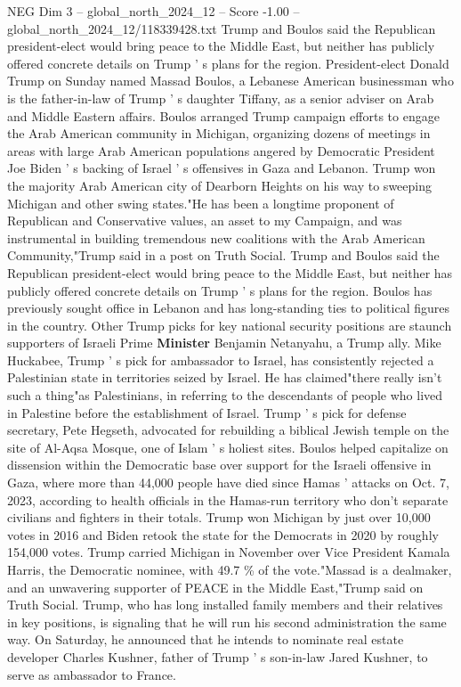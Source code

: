 \begin{textsample}{NEG Dim 3 – global\_north\_2024\_12 – Score -1.00 – global\_north\_2024\_12/118339428.txt}  \label{ex:f3_neg_222}
Trump and Boulos said the Republican president-elect would bring peace to the Middle East, but neither has publicly offered concrete details on Trump ' s plans for the region.
President-elect Donald Trump on Sunday named Massad Boulos, a Lebanese American businessman who is the father-in-law of Trump ' s daughter Tiffany, as a senior adviser on Arab and Middle Eastern affairs.
Boulos arranged Trump campaign efforts to engage the Arab American community in Michigan, organizing dozens of meetings in areas with large Arab American populations angered by Democratic President Joe Biden ' s backing of Israel ' s offensives in Gaza and Lebanon.
Trump won the majority Arab American city of Dearborn Heights on his way to sweeping Michigan and other swing states."He has been a longtime proponent of Republican and Conservative values, an asset to my Campaign, and was instrumental in building tremendous new coalitions with the Arab American Community,"Trump said in a post on Truth Social.
Trump and Boulos said the Republican president-elect would bring peace to the Middle East, but neither has publicly offered concrete details on Trump ' s plans for the region.
Boulos has previously sought office in Lebanon and has long-standing ties to political figures in the country.
Other Trump picks for key national security positions are staunch supporters of Israeli Prime \textbf{Minister} Benjamin Netanyahu, a Trump ally.
Mike Huckabee, Trump ' s pick for ambassador to Israel, has consistently rejected a Palestinian state in territories seized by Israel.
He has claimed"there really isn't such a thing"as Palestinians, in referring to the descendants of people who lived in Palestine before the establishment of Israel.
Trump ' s pick for defense secretary, Pete Hegseth, advocated for rebuilding a biblical Jewish temple on the site of Al-Aqsa Mosque, one of Islam ' s holiest sites.
Boulos helped capitalize on dissension within the Democratic base over support for the Israeli offensive in Gaza, where more than 44,000 people have died since Hamas ' attacks on Oct. 7, 2023, according to health officials in the Hamas-run territory who don't separate civilians and fighters in their totals.
Trump won Michigan by just over 10,000 votes in 2016 and Biden retook the state for the Democrats in 2020 by roughly 154,000 votes.
Trump carried Michigan in November over Vice President Kamala Harris, the Democratic nominee, with 49.7 \% of the vote."Massad is a dealmaker, and an unwavering supporter of PEACE in the Middle East,"Trump said on Truth Social.
Trump, who has long installed family members and their relatives in key positions, is signaling that he will run his second administration the same way.
On Saturday, he announced that he intends to nominate real estate developer Charles Kushner, father of Trump ' s son-in-law Jared Kushner, to serve as ambassador to France.

\end{textsample}
